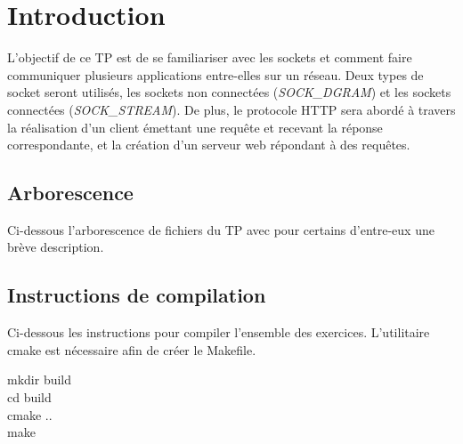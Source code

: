 \section{Introduction}
L'objectif de ce TP est de se familiariser avec les sockets et comment faire communiquer plusieurs applications entre-elles sur un réseau. Deux types de socket seront utilisés, les sockets non connectées (\emph{SOCK\_DGRAM}) et les sockets connectées (\emph{SOCK\_STREAM}). De plus, le protocole HTTP sera abordé à travers la réalisation d'un client émettant une requête et recevant la réponse correspondante, et la création d'un serveur web répondant à des requêtes.

\subsection{Arborescence}
\noindent Ci-dessous l'arborescence de fichiers du TP avec pour certains d'entre-eux une brève description.


\subsection{Instructions de compilation}
Ci-dessous les instructions pour compiler l'ensemble des exercices. L'utilitaire cmake \cite{cite:cmake} est nécessaire afin de créer le Makefile.

\begin{mdframed}[backgroundcolor=lightblue, linecolor=darkblue]
	mkdir build\\
	cd build\\
	cmake ..\\
	make
\end{mdframed}

